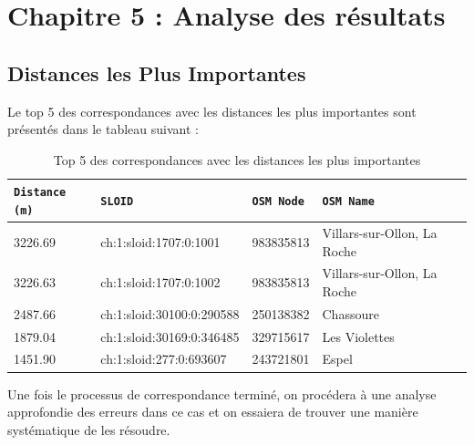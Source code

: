 \chapter{Chapitre 5 : Analyse des résultats}


\section{Distances les Plus Importantes}

Le top 5 des correspondances avec les distances les plus importantes sont présentés dans le tableau suivant :

\begin{table}[h]
\label{tab:distances_importantes}
\centering
\begin{tabular}{l l l l}
\toprule
\texttt{Distance (m)} & \texttt{SLOID} & \texttt{OSM Node} & \texttt{OSM Name} \\
\midrule
3226.69 & ch:1:sloid:1707:0:1001 & 983835813 & Villars-sur-Ollon, La Roche \\
3226.63 & ch:1:sloid:1707:0:1002 & 983835813 & Villars-sur-Ollon, La Roche \\
2487.66 & ch:1:sloid:30100:0:290588 & 250138382 & Chassoure \\
1879.04 & ch:1:sloid:30169:0:346485 & 329715617 & Les Violettes \\
1451.90 & ch:1:sloid:277:0:693607 & 243721801 & Espel \\
\bottomrule
\end{tabular}
    \caption[Top 5 – plus grandes distances]{Top 5 des correspondances avec les distances les plus importantes}
\end{table}
Une fois le processus de correspondance terminé, on procédera à une analyse approfondie des erreurs dans ce cas et on essaiera de trouver une manière systématique de les résoudre.
\clearpage

